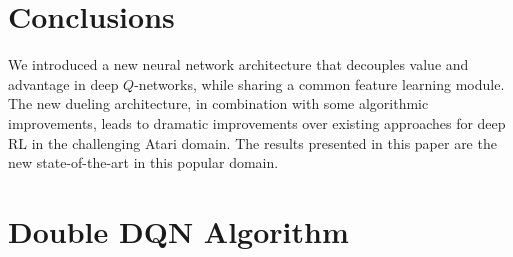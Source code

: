 \documentclass{article}
\begin{document}


\section{Conclusions}
\label{sec:conclusion}

We introduced a new neural network architecture that decouples value and advantage in deep $Q$-networks, while sharing a common feature learning module. The new dueling architecture, in combination with some algorithmic improvements, leads to dramatic improvements over existing approaches for deep RL in the challenging Atari domain. The results presented in this paper are the new state-of-the-art in this popular domain. 






\appendix

\onecolumn
\section{Double DQN Algorithm}
\label{sec:ddqn_alg}



% 
\end{document}
